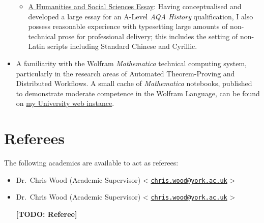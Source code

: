 \documentclass{article}
\makeatletter
\newcommand{\todomark}[1]{{\color{red}\textbf{[TODO: #1]}}}
\newcommand{\yorkemail}[2]{%
        #1
        \textless%
        \href{mailto:#2@york.ac.uk}{\texttt{#2@york.ac.uk}}%
        \textgreater%
}
\newcommand{\githublink}[2]{\href{https://github.com/oliverdixon/#1}{#2}}
\newcommand{\weblink}[2]{\href{https://www-users.york.ac.uk/~od641/#1}{#2}}
\makeatother
\begin{document}
\begin{itemize}
\begin{itemize}
                \item \githublink{opium}{A Humanities and Social Sciences
                Essay}: Having conceptualised and developed a large essay for an
                A-Level \textit{AQA History} qualification, I also possess
                reasonable experience with typesetting large amounts of
                non-technical prose for professional delivery; this includes the
                setting of non-Latin scripts including Standard Chinese and
                Cyrillic.
        \end{itemize}
        \item A familiarity with the Wolfram \textit{Mathematica} technical
        computing system, particularly in the research areas of Automated
        Theorem-Proving and Distributed Workflows. A small cache of
        \textit{Mathematica} notebooks, published to demonstrate moderate
        competence in the Wolfram Language, can be found on
        \weblink{misc\_mma}{my University web instance}.
\end{itemize}
%
%
\section{Referees}
The following academics are available to act as referees:
\begin{itemize}
        \item \yorkemail{Dr.\ Chris Wood (Academic Supervisor)}{chris.wood}
        \item \yorkemail{Dr.\ Chris Wood (Academic Supervisor)}{chris.wood}
        \todomark{Referee}%
\end{itemize}
%
\end{document}
